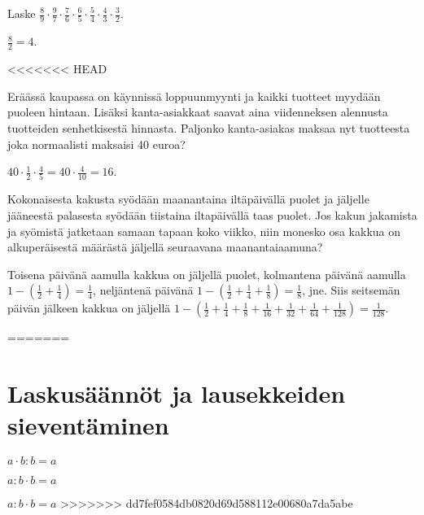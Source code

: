 \begin{tehtava}
Laske 
$\frac{8}{9}\cdot \frac{9}{7} \cdot \frac{7}{6} \cdot \frac{6}{5} \cdot \frac{5}{4} \cdot \frac{4}{3} \cdot \frac{3}{2}$.
\begin{vastaus}
$\frac{8}{2}=4$.
\end{vastaus}

\end{tehtava}


<<<<<<< HEAD
\begin{tehtava}
	Eräässä kaupassa on käynnissä loppuunmyynti ja kaikki tuotteet myydään puoleen hintaan. 
	Lisäksi kanta-asiakkaat saavat aina viidenneksen alennusta tuotteiden senhetkisestä hinnasta.
	Paljonko kanta-asiakas maksaa nyt tuotteesta joka normaalisti maksaisi 40 euroa?
	\begin{vastaus}
	$40\cdot \frac{1}{2} \cdot \frac{4}{5}=40\cdot \frac{4}{10}= 16$. 
	\end{vastaus}
\end{tehtava}

\begin{tehtava}
Kokonaisesta kakusta syödään maanantaina iltäpäivällä puolet ja jäljelle jääneestä palasesta syödään tiistaina 	iltapäivällä taas puolet. Jos kakun jakamista ja syömistä jatketaan samaan tapaan koko viikko, niin monesko 
osa kakkua on alkuperäisestä määrästä jäljellä seuraavana maanantaiaamuna?
\begin{vastaus}
Toisena päivänä aamulla kakkua on jäljellä puolet, kolmantena päivänä aamulla $1-(\frac{1}{2}+\frac{1}{4})=\frac{1}{4}$, 
neljäntenä päivänä $1-(\frac{1}{2}+\frac{1}{4}+\frac{1}{8})=\frac{1}{8}$, jne. Siis seitsemän päivän jälkeen kakkua 
on jäljellä $1-(\frac{1}{2}+\frac{1}{4}+\frac{1}{8}+\frac{1}{16}+\frac{1}{32}+\frac{1}{64}+\frac{1}{128})=\frac{1}{128}$.  
\end{vastaus}
\end{tehtava}

=======
\chapter{Laskusäännöt ja lausekkeiden sieventäminen}



$a\cdot b:b=a$

$a:b\cdot b=a$

$a:b\cdot b=a$
>>>>>>> dd7fef0584db0820d69d588112e00680a7da5abe
